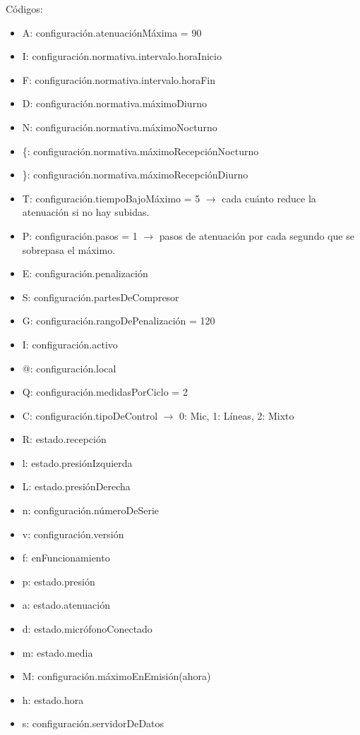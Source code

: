 Códigos:
\begin{itemize}
    \item A: configuración.atenuaciónMáxima = 90
    \item I: configuración.normativa.intervalo.horaInicio
    \item F: configuración.normativa.intervalo.horaFin
    \item D: configuración.normativa.máximoDiurno
    \item N: configuración.normativa.máximoNocturno
    \item \{: configuración.normativa.máximoRecepciónNocturno
    \item \}: configuración.normativa.máximoRecepciónDiurno
    \item T: configuración.tiempoBajoMáximo = 5 $\rightarrow$ cada cuánto reduce la atenuación si no hay subidas.
    \item P: configuración.pasos = 1 $\rightarrow$ pasos de atenuación por cada segundo que se sobrepasa el máximo.
    \item E: configuración.penalización
    \item S: configuración.partesDeCompresor
    \item G: configuración.rangoDePenalización = 120
    \item I: configuración.activo
    \item @: configuración.local
    \item Q: configuración.medidasPorCiclo = 2
    \item C: configuración.tipoDeControl $\rightarrow$ 0: Mic, 1: Líneas, 2: Mixto
    \item R: estado.recepción
    \item l: estado.presiónIzquierda
    \item L: estado.presiónDerecha
    \item n: configuración.númeroDeSerie
    \item v: configuración.versión
    \item f: enFuncionamiento
    \item p: estado.presión
    \item a: estado.atenuación
    \item d: estado.micrófonoConectado
    \item m: estado.media
    \item M: configuración.máximoEnEmisión(ahora)
    \item h: estado.hora
    \item s: configuración.servidorDeDatos

\end{itemize}
